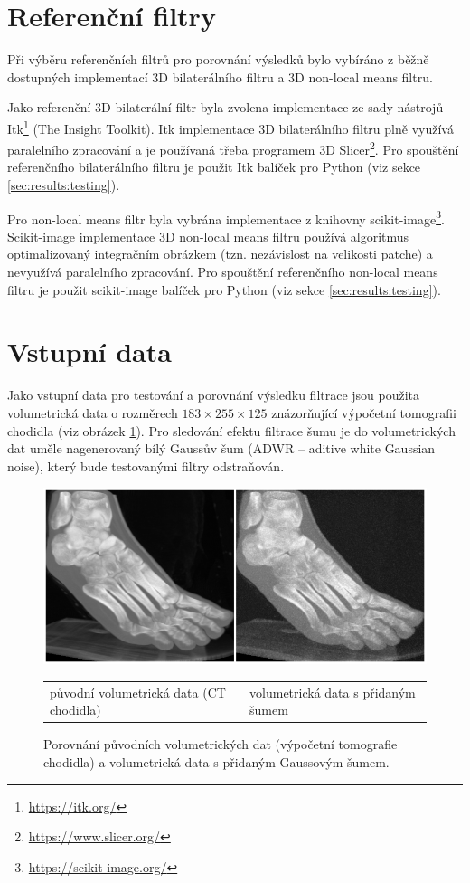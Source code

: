 \section{Referenční filtry}
\label{sec:results:ref_filters}
Při výběru referenčních filtrů pro porovnání výsledků bylo vybíráno z běžně dostupných implementací 3D bilaterálního filtru a 3D non-local means filtru. 

Jako referenční 3D bilaterální filtr byla zvolena implementace ze sady nástrojů Itk\footnote{\url{https://itk.org/}} (The Insight Toolkit).
Itk implementace 3D bilaterálního filtru plně využívá paralelního zpracování a je používaná třeba programem 3D Slicer\footnote{\url{https://www.slicer.org/}}. Pro spouštění referenčního bilaterálního filtru je použit Itk balíček pro Python (viz sekce \ref{sec:results:testing}). 

Pro non-local means filtr byla vybrána implementace z knihovny scikit-image\footnote{\url{https://scikit-image.org/}}. Scikit-image implementace 3D non-local means filtru používá algoritmus optimalizovaný integračním obrázkem (tzn. nezávislost na velikosti patche) a nevyužívá paralelního zpracování. Pro spouštění referenčního non-local means filtru je použit scikit-image balíček pro Python (viz sekce \ref{sec:results:testing}).

\section{Vstupní data}
\label{sec:results:data}
Jako vstupní data pro testování a porovnání výsledku filtrace jsou použita volumetrická data o rozměrech $183\times255\times125$ znázorňující výpočetní tomografii chodidla (viz obrázek \ref{fig:results:3dfoot_vs_noisy}). Pro sledování efektu filtrace šumu je do volumetrických dat uměle nagenerovaný bílý Gaussův šum (ADWR -- aditive white Gaussian noise), který bude testovanými filtry odstraňován.

\begin{figure} [H]
    \centering
    \label{fig:results:3dfoot_vs_noisy}
    \includegraphics[width=1\textwidth]{figures/3dfoot_vs_noisy.png}
    \begin{tabularx}{1\textwidth}{>{\centering}X>{\centering}X}
        původní volumetrická data (CT chodidla) & volumetrická data s přidaným šumem
    \end{tabularx}
    \caption{Porovnání původních volumetrických dat (výpočetní tomografie chodidla) a volumetrická data s přidaným Gaussovým šumem.}
\end{figure}

